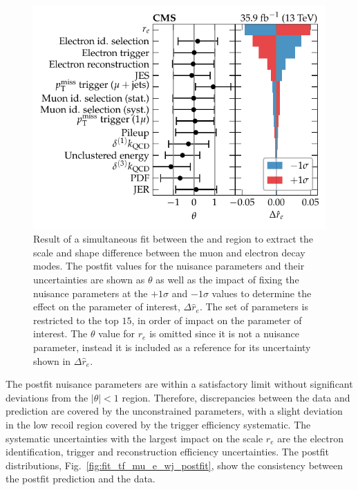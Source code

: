 \begin{figure}[htb]
    \centering
    \includegraphics{chapters/042_backgrounds/images/impacts_tfmu2ewj.pdf}
    \caption[Nuisance parameters from a simultaneous fit to the muon and electron control regions]{
        Result of a simultaneous fit between the \muplusjets and \eleplusjets region to extract the scale and shape difference between the muon and electron decay modes. The postfit values for the nuisance parameters and their uncertainties are shown as $\theta$ as well as the impact of fixing the nuisance parameters at the $+1\sigma$ and $-1\sigma$ values to determine the effect on the parameter of interest, $\Delta \hat{r}_e$. The set of parameters is restricted to the top $15$, in order of impact on the parameter of interest. The $\theta$ value for $r_e$ is omitted since it is not a nuisance parameter, instead it is included as a reference for its uncertainty shown in $\Delta \hat{r}_e$.
    }
    \label{fig:fit_tf_mu_e_wj_impacts}
\end{figure}
%
The postfit nuisance parameters are within a satisfactory limit without significant deviations from the $|\theta|<1$ region. Therefore, discrepancies between the data and prediction are covered by the unconstrained parameters, with a slight deviation in the low recoil \muplusjets region covered by the \ptmiss trigger efficiency systematic. The systematic uncertainties with the largest impact on the scale $r_e$ are the electron identification, trigger and reconstruction efficiency uncertainties. The postfit distributions, Fig.~\ref{fig:fit_tf_mu_e_wj_postfit}, show the consistency between the postfit prediction and the data.
